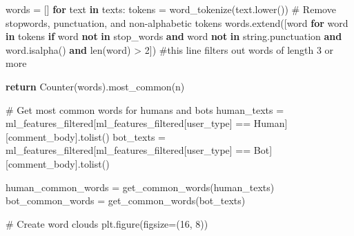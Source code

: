 \documentclass[
  12pt,
  letterpaper,
  DIV=11,
  numbers=noendperiod]{scrartcl}
\newenvironment{Shaded}{\begin{snugshade}}{\end{snugshade}}
\newcommand{\BuiltInTok}[1]{\textcolor[rgb]{0.00,0.23,0.31}{#1}}
\newcommand{\CommentTok}[1]{\textcolor[rgb]{0.37,0.37,0.37}{#1}}
\newcommand{\ControlFlowTok}[1]{\textcolor[rgb]{0.00,0.23,0.31}{\textbf{#1}}}
\newcommand{\DecValTok}[1]{\textcolor[rgb]{0.68,0.00,0.00}{#1}}
\newcommand{\KeywordTok}[1]{\textcolor[rgb]{0.00,0.23,0.31}{\textbf{#1}}}
\newcommand{\NormalTok}[1]{\textcolor[rgb]{0.00,0.23,0.31}{#1}}
\newcommand{\OperatorTok}[1]{\textcolor[rgb]{0.37,0.37,0.37}{#1}}
\newcommand{\StringTok}[1]{\textcolor[rgb]{0.13,0.47,0.30}{#1}}
\begin{document}
\begin{Shaded}
\begin{Highlighting}[]
\NormalTok{    words }\OperatorTok{=}\NormalTok{ []}
    \ControlFlowTok{for}\NormalTok{ text }\KeywordTok{in}\NormalTok{ texts:}
\NormalTok{        tokens }\OperatorTok{=}\NormalTok{ word\_tokenize(text.lower())}
        \CommentTok{\# Remove stopwords, punctuation, and non{-}alphabetic tokens}
\NormalTok{        words.extend([word }\ControlFlowTok{for}\NormalTok{ word }\KeywordTok{in}\NormalTok{ tokens }\ControlFlowTok{if}\NormalTok{ word }\KeywordTok{not} \KeywordTok{in}\NormalTok{ stop\_words }
                     \KeywordTok{and}\NormalTok{ word }\KeywordTok{not} \KeywordTok{in}\NormalTok{ string.punctuation }
                     \KeywordTok{and}\NormalTok{ word.isalpha() }
                     \KeywordTok{and} \BuiltInTok{len}\NormalTok{(word) }\OperatorTok{\textgreater{}} \DecValTok{2}\NormalTok{]) }\CommentTok{\#this line filters out words of length 3 or more}
    
    \ControlFlowTok{return}\NormalTok{ Counter(words).most\_common(n)}

\CommentTok{\# Get most common words for humans and bots}
\NormalTok{human\_texts }\OperatorTok{=}\NormalTok{ ml\_features\_filtered[ml\_features\_filtered[}\StringTok{\textquotesingle{}user\_type\textquotesingle{}}\NormalTok{] }\OperatorTok{==} \StringTok{\textquotesingle{}Human\textquotesingle{}}\NormalTok{][}\StringTok{\textquotesingle{}comment\_body\textquotesingle{}}\NormalTok{].tolist()}
\NormalTok{bot\_texts }\OperatorTok{=}\NormalTok{ ml\_features\_filtered[ml\_features\_filtered[}\StringTok{\textquotesingle{}user\_type\textquotesingle{}}\NormalTok{] }\OperatorTok{==} \StringTok{\textquotesingle{}Bot\textquotesingle{}}\NormalTok{][}\StringTok{\textquotesingle{}comment\_body\textquotesingle{}}\NormalTok{].tolist()}

\NormalTok{human\_common\_words }\OperatorTok{=}\NormalTok{ get\_common\_words(human\_texts)}
\NormalTok{bot\_common\_words }\OperatorTok{=}\NormalTok{ get\_common\_words(bot\_texts)}

\CommentTok{\# Create word clouds}
\NormalTok{plt.figure(figsize}\OperatorTok{=}\NormalTok{(}\DecValTok{16}\NormalTok{, }\DecValTok{8}\NormalTok{))}


\end{Highlighting}
\end{Shaded}
\end{document}
